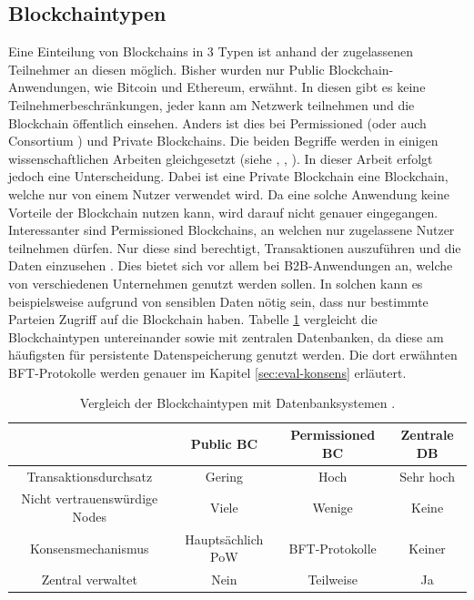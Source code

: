 \subsection{Blockchaintypen}
Eine Einteilung von Blockchains in 3 Typen ist anhand der zugelassenen Teilnehmer an diesen möglich. Bisher wurden nur Public Blockchain-Anwendungen, wie Bitcoin und Ethereum, erwähnt. In diesen gibt es keine Teilnehmerbeschränkungen, jeder kann am Netzwerk teilnehmen und die Blockchain öffentlich einsehen. Anders ist dies bei Permissioned (oder auch Consortium \cite{BenHamidaBlockchainEnterpriseOverview2017}) und Private Blockchains. Die beiden Begriffe werden in einigen wissenschaftlichen Arbeiten gleichgesetzt (siehe \cite{Gramolidangerprivateblockchains2016}, \cite{PongnumkulPerformanceAnalysisPrivate2017}, \cite{LiScalablePrivateIndustrial2017}). In dieser Arbeit erfolgt jedoch eine Unterscheidung. Dabei ist eine Private Blockchain eine Blockchain, welche nur von einem Nutzer verwendet wird. Da eine solche Anwendung keine Vorteile der Blockchain nutzen kann, wird darauf nicht genauer eingegangen. Interessanter sind Permissioned Blockchains, an welchen nur zugelassene Nutzer teilnehmen dürfen. Nur diese sind berechtigt, Transaktionen auszuführen und die Daten einzusehen \cite{LiScalablePrivateIndustrial2017}. Dies bietet sich vor allem bei \acs{B2B}-Anwendungen an, welche von verschiedenen Unternehmen genutzt werden sollen. In solchen kann es beispielsweise aufgrund von sensiblen Daten nötig sein, dass nur bestimmte Parteien Zugriff auf die Blockchain haben. Tabelle \ref{tab:bc-comparison} vergleicht die Blockchaintypen untereinander sowie mit zentralen Datenbanken, da diese am häufigsten für persistente Datenspeicherung genutzt werden. Die dort erwähnten \acs{BFT}-Protokolle werden genauer im Kapitel \ref{sec:eval-konsens} erläutert.

\begin{table}[h]
    \centering
	\begin{tabular}{c c c c}
	\textbf{} & \textbf{Public \acs{BC}} & \textbf{Permissioned \acs{BC}}  & \textbf{Zentrale DB} \\ \hline
	Transaktionsdurchsatz & Gering & Hoch & Sehr hoch \\ \hline
    Nicht vertrauenswürdige Nodes & Viele & Wenige & Keine \\ \hline
    Konsensmechanismus & Hauptsächlich \acs{PoW} & \acs{BFT}-Protokolle & Keiner \\ \hline
    Zentral verwaltet & Nein & Teilweise & Ja \\
    \end{tabular}
    \caption{Vergleich der Blockchaintypen mit Datenbanksystemen \cite{WustyouneedBlockchain2017}\cite{ZhengBlockchainChallengesOpportunities2017}.}
	\label{tab:bc-comparison}
\end{table}

